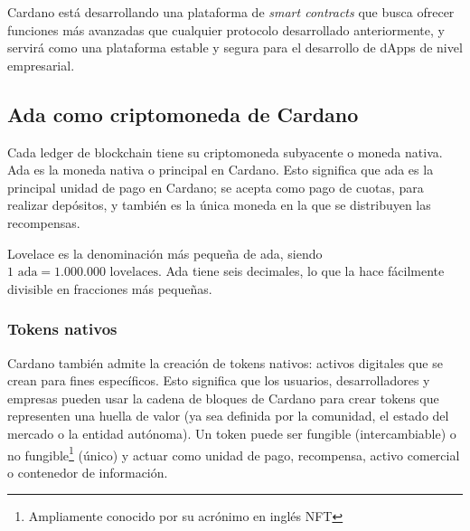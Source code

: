 \documentclass[12pt]{book}
\begin{document}
Cardano está desarrollando una plataforma de \textit{smart contracts} que busca ofrecer funciones más avanzadas que cualquier protocolo desarrollado anteriormente, y servirá como una plataforma estable y segura para el desarrollo de dApps de nivel empresarial.

\subsection{Ada como criptomoneda de Cardano}


Cada ledger de blockchain tiene su criptomoneda subyacente o moneda nativa. Ada es la moneda nativa o principal en Cardano. Esto significa que ada es la principal unidad de pago en Cardano; se acepta como pago de cuotas, para realizar depósitos, y también es la única moneda en la que se distribuyen las recompensas.

Lovelace es la denominación más pequeña de ada, siendo $\boxed{ 1 \text{ ada} = 1.000.000 \text{ lovelaces}}$. Ada tiene seis decimales, lo que la hace fácilmente divisible en fracciones más pequeñas.

\subsubsection{Tokens nativos}

Cardano también admite la creación de tokens nativos: activos digitales que se crean para fines específicos. Esto significa que los usuarios, desarrolladores y empresas pueden usar la cadena de bloques de Cardano para crear tokens que representen una huella de valor (ya sea definida por la comunidad, el estado del mercado o la entidad autónoma). Un token puede ser fungible (intercambiable) o no fungible\footnote{Ampliamente conocido por su acrónimo en inglés NFT} (único) y actuar como unidad de pago, recompensa, activo comercial o contenedor de información.



\end{document}
